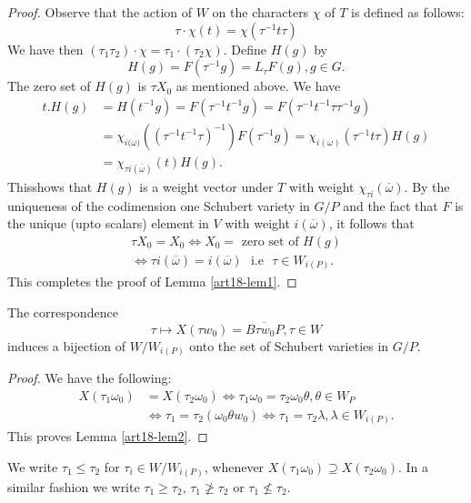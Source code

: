 \begin{proof}
Observe that the action of $W$ on the characters $\chi$ of $T$ is defined as follows:
$$
\tau \cdot \chi (t) = \chi(\tau^{-1} t\tau)
$$
We have then $(\tau_1 \tau_2) \cdot \chi = \tau_1 \cdot (\tau_2 \chi)$. Define $H(g)$ by
$$
H(g) = F(\tau^{-1} g ) = L_\tau F (g), g\in G.
$$
The zero set of $H(g)$ is $\tau X_0$ as mentioned above. We have
\begin{align*}
t. H(g) & = H(t^{-1}g) = F(\tau^{-1} t^{-1}g) = F(\tau^{-1} t^{-1} \tau \tau^{-1} g)\\
& = \chi_{i(\overline{\omega)}} ((\tau^{-1}t^{-1} \tau)^{-1}) F(\tau^{-1}g) = \chi_{i(\omega)} (\tau^{-1} t \tau) H(g)\\
& = \chi_{\tau i (\overline{\omega})} (t) H (g).
\end{align*}
This\pageoriginale shows that $H(g)$ is a weight vector under $T$ with weight $\chi_{\tau i} (\overline{\omega})$. By the uniqueness of the codimension one Schubert variety in $G/P$ and the fact that $F$ is the unique (upto scalars) element in $V$ with weight $i(\overline{\omega})$, it follows that 
\begin{gather*}
\tau X_0 = X_0 \Leftrightarrow X_0 = \text{ zero set of } H(g)\\
\Leftrightarrow \tau i (\overline{\omega}) = i (\overline{\omega}) \text{~ i.e ~} \tau \in W_{i(P)}.
\end{gather*}
This completes the proof of Lemma \ref{art18-lem1}.
\end{proof}
        
\begin{lem}\label{art18-lem2}
The correspondence
$$
\tau \mapsto X (\tau w_0) = \overline{B \tau w_0 P}, \tau \in W
$$
induces a bijection of $W/W_{i(P)}$ onto the set of Schubert varieties in $G/P$.
\end{lem}

\begin{proof}
We have the following:
\begin{align*}
X(\tau_1 \omega_0) & = X (\tau_2 \omega_0) \Leftrightarrow \tau_1 \omega_0 = \tau_2 \omega_0 \theta, \theta \in W_P\\
& \Leftrightarrow \tau_1 = \tau_2 (\omega_0 \theta w_0) \Leftrightarrow \tau_1 = \tau_2 \lambda, \lambda \in W_{i(P)}.
\end{align*}
This proves Lemma \ref{art18-lem2}.
\end{proof}

\begin{definition}\label{art18-defi1}
We write $\tau_1 \leqslant \tau_2$ for $\tau_i \in W / W_{i(P)}$, whenever $X(\tau_1 \omega_0) \supseteq X (\tau_2 \omega_0)$. In a similar fashion we write $\tau_1 \geqslant \tau_2$, $\tau_1 \not\geqslant \tau_2$ or $\tau_1 \not\leqslant \tau_2$.
\end{definition}

